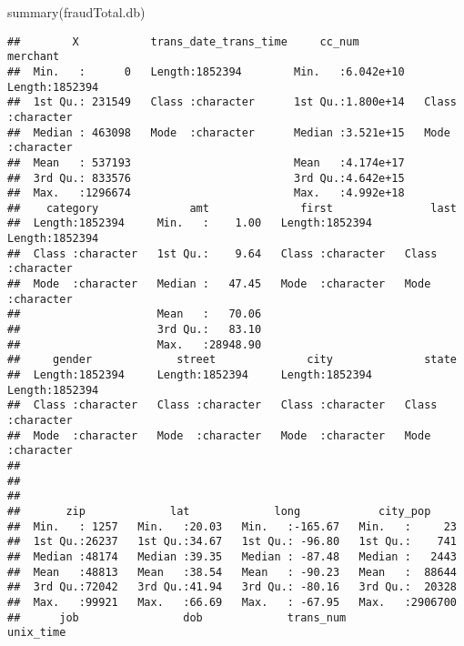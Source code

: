 \documentclass[
]{article}
\newenvironment{Shaded}{\begin{snugshade}}{\end{snugshade}}
\newcommand{\FunctionTok}[1]{\textcolor[rgb]{0.00,0.00,0.00}{#1}}
\newcommand{\NormalTok}[1]{#1}
\begin{document}
\begin{Shaded}
\begin{Highlighting}[]
\FunctionTok{summary}\NormalTok{(fraudTotal.db)}
\end{Highlighting}
\end{Shaded}

\begin{verbatim}
##        X           trans_date_trans_time     cc_num            merchant        
##  Min.   :      0   Length:1852394        Min.   :6.042e+10   Length:1852394    
##  1st Qu.: 231549   Class :character      1st Qu.:1.800e+14   Class :character  
##  Median : 463098   Mode  :character      Median :3.521e+15   Mode  :character  
##  Mean   : 537193                         Mean   :4.174e+17                     
##  3rd Qu.: 833576                         3rd Qu.:4.642e+15                     
##  Max.   :1296674                         Max.   :4.992e+18                     
##    category              amt              first               last          
##  Length:1852394     Min.   :    1.00   Length:1852394     Length:1852394    
##  Class :character   1st Qu.:    9.64   Class :character   Class :character  
##  Mode  :character   Median :   47.45   Mode  :character   Mode  :character  
##                     Mean   :   70.06                                        
##                     3rd Qu.:   83.10                                        
##                     Max.   :28948.90                                        
##     gender             street              city              state          
##  Length:1852394     Length:1852394     Length:1852394     Length:1852394    
##  Class :character   Class :character   Class :character   Class :character  
##  Mode  :character   Mode  :character   Mode  :character   Mode  :character  
##                                                                             
##                                                                             
##                                                                             
##       zip             lat             long            city_pop      
##  Min.   : 1257   Min.   :20.03   Min.   :-165.67   Min.   :     23  
##  1st Qu.:26237   1st Qu.:34.67   1st Qu.: -96.80   1st Qu.:    741  
##  Median :48174   Median :39.35   Median : -87.48   Median :   2443  
##  Mean   :48813   Mean   :38.54   Mean   : -90.23   Mean   :  88644  
##  3rd Qu.:72042   3rd Qu.:41.94   3rd Qu.: -80.16   3rd Qu.:  20328  
##  Max.   :99921   Max.   :66.69   Max.   : -67.95   Max.   :2906700  
##      job                dob             trans_num           unix_time        

\end{verbatim}
\end{document}
